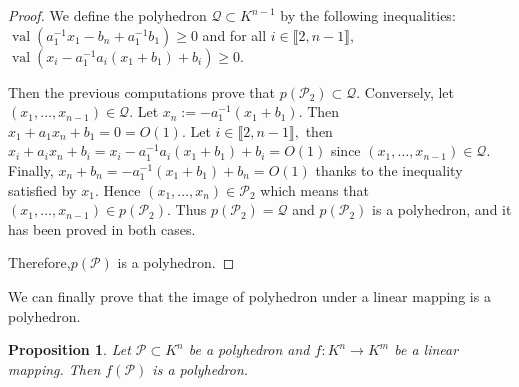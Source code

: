 \documentclass[a4paper,oneside,11pt]{article}
\newtheorem{proposition}[theorem]{Proposition}
\newcommand{\PP}{\mathcal{P}}
\newcommand{\Qc}{\mathcal{Q}}
\DeclareMathOperator{\val}{val}
\begin{document}
\begin{proof}
We define the polyhedron $\Qc \subset K^{n-1}$ by the following inequalities:
$\val(a_1^{-1}x_1- b_n +a_1^{-1}b_1) \geq 0$ and for all $i \in \llbracket 2,n-1 \rrbracket,$
$\val(x_i-a_1^{-1}a_i(x_1+b_1)+b_i) \geq 0.$

Then the previous computations prove that $p(\PP_2)\subset \Qc.$
Conversely, let $(x_1,\dots,x_{n-1}) \in \Qc.$
Let $x_n := -a_1^{-1}(x_1+b_1).$
Then
$x_1+a_1 x_n+b_1=0=O(1).$
Let $i \in \llbracket 2,n-1 \rrbracket,$
then $x_i+a_i x_n+b_i=x_i-a_1^{-1}a_i(x_1+b_1)+b_i=O(1)$
since $(x_1,\dots,x_{n-1}) \in \Qc.$
Finally, 
$x_n+b_n=-a_1^{-1}(x_1+b_1)+b_n=O(1)$ thanks to the inequality satisfied by $x_1.$
Hence $(x_1,\dots,x_n) \in \PP_2$
which means that $(x_1,\dots,x_{n-1}) \in p(\PP_2).$
Thus $p(\PP_2)= \Qc$ and $p(\PP_2)$ is a polyhedron,
and it has been proved in both cases.

Therefore,$p(\PP)$ is a polyhedron.

\end{proof}

We can finally prove that the image of polyhedron under a linear mapping is a polyhedron.
\begin{proposition}
Let $\PP \subset K^n$ be a polyhedron and $f: K^n \rightarrow K^m$
be a linear mapping. Then $f(\PP)$ is a polyhedron.
\end{proposition}
\end{document}
